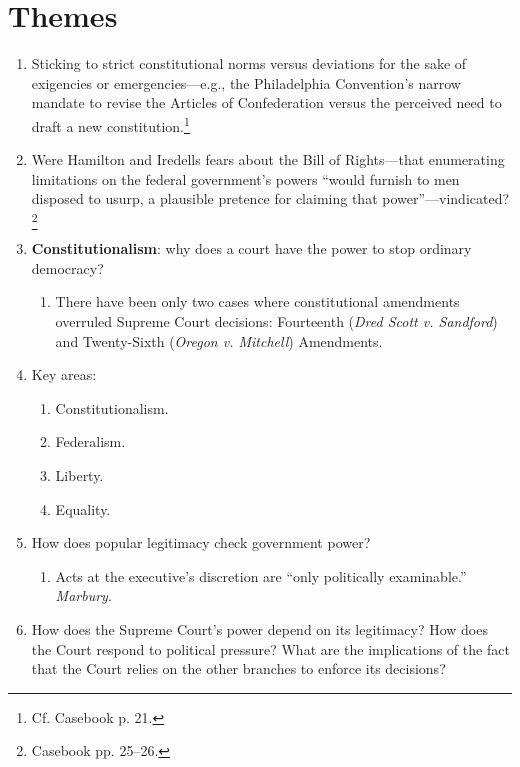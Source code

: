\section{Themes}

\begin{enumerate}
    \item Sticking to strict constitutional norms versus deviations for the 
    sake of exigencies or emergencies---e.g., the Philadelphia Convention's 
    narrow mandate to revise the Articles of Confederation versus the 
    perceived need to draft a new constitution.\footnote{Cf. Casebook p. 21.}
    \item Were Hamilton and Iredells fears about the Bill of Rights---that 
    enumerating limitations on the federal government's powers ``would furnish 
    to men disposed to usurp, a plausible pretence for claiming that 
    power''---vindicated?\footnote{Casebook pp. 25--26.}
    \item \textbf{Constitutionalism}: why does a court have the power to stop 
    ordinary democracy?
    \begin{enumerate}
        \item There have been only two cases where constitutional amendments 
        overruled Supreme Court decisions: Fourteenth (\emph{Dred Scott v. 
        Sandford}) and Twenty-Sixth (\emph{Oregon v. Mitchell}) Amendments.
    \end{enumerate}
    \item Key areas:
    \begin{enumerate}
        \item Constitutionalism.
        \item Federalism.
        \item Liberty.
        \item Equality.
    \end{enumerate}
    \item How does popular legitimacy check government power?
    \begin{enumerate}
        \item Acts at the executive's discretion are ``only politically 
        examinable.'' \emph{Marbury}.
    \end{enumerate}
    \item How does the Supreme Court's power depend on its legitimacy? How 
    does the Court respond to political pressure? What are the implications of 
    the fact that the Court relies on the other branches to enforce its 
    decisions?
    \begin{enumerate}

\end{enumerate}
\end{enumerate}

